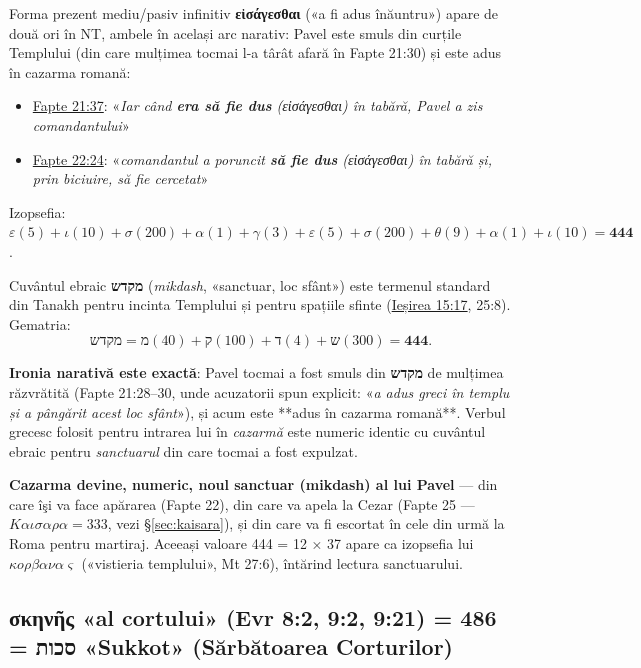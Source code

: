 \documentclass[12pt,a4paper,twoside,openany]{book}
\begin{document}
Forma prezent mediu/pasiv infinitiv \textbf{εἰσάγεσθαι} («a fi adus înăuntru») apare de două ori în NT, ambele în același arc narativ: Pavel este smuls din curțile Templului (din care mulțimea tocmai l-a târât afară în Fapte 21:30) și este adus în cazarma romană:

\begin{itemize}
  \item \href{https://bibliaortodoxa.ro/carte.php?id=26\&cap=21\#37}{Fapte 21:37}: «\textit{Iar când \textbf{era să fie dus} (εἰσάγεσθαι) în tabără, Pavel a zis comandantului}»
  \item \href{https://bibliaortodoxa.ro/carte.php?id=26\&cap=22\#24}{Fapte 22:24}: «\textit{comandantul a poruncit \textbf{să fie dus} (εἰσάγεσθαι) în tabără și, prin biciuire, să fie cercetat}»
\end{itemize}

Izopsefia: $\varepsilon(5)+\iota(10)+\sigma(200)+\alpha(1)+\gamma(3)+\varepsilon(5)+\sigma(200)+\theta(9)+\alpha(1)+\iota(10) = \mathbf{444}$.

Cuvântul ebraic \textbf{מקדש} (\textit{mikdash}, «sanctuar, loc sfânt») este termenul standard din Tanakh pentru incinta Templului și pentru spațiile sfinte (\href{https://bibliaortodoxa.ro/carte.php?id=2\&cap=15\#17}{Ieșirea 15:17}, 25:8). Gematria:
\[
\text{מקדש} = \text{מ}(40) + \text{ק}(100) + \text{ד}(4) + \text{ש}(300) = \mathbf{444}.
\]

\textbf{Ironia narativă este exactă}: Pavel tocmai a fost smuls din \textbf{מקדש} de mulțimea răzvrătită (Fapte 21:28--30, unde acuzatorii spun explicit: «\textit{a adus greci în templu și a pângărit acest loc sfânt}»), și acum este **adus în cazarma romană**. Verbul grecesc folosit pentru intrarea lui în \textit{cazarmă} este numeric identic cu cuvântul ebraic pentru \textit{sanctuarul} din care tocmai a fost expulzat.

\textbf{Cazarma devine, numeric, noul sanctuar (mikdash) al lui Pavel} — din care îşi va face apărarea (Fapte 22), din care va apela la Cezar (Fapte 25 — $K\alpha\iota\sigma\alpha\rho\alpha = 333$, vezi \S\ref{sec:kaisara}), și din care va fi escortat în cele din urmă la Roma pentru martiraj. Aceeași valoare 444 = 12 × 37 apare ca izopsefia lui $\kappa o\rho\beta\alpha\nu\alpha\varsigma$ («vistieria templului», Mt 27:6), întărind lectura sanctuarului.

\subsection{σκηνῆς «al cortului» (Evr 8:2, 9:2, 9:21) = 486 = סכות «Sukkot» (Sărbătoarea Corturilor)}
\end{document}
